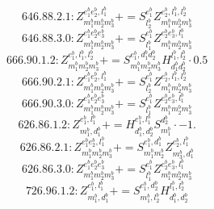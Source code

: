 \documentclass[letterpaper,10pt,fleqn,leqno,onecolumn]{article}
\begin{document}
\begin{equation} \;\;\;\;\;\;  646.88.2.1: Z^{e_{1}^{b}e_{2}^{b},l_{1}^{b}}_{m_{1}^{b}m_{2}^{b}m_{3}^{b}}+=S^{e_{1}^{b}}_{l_{2}^{b}}Z^{e_{2}^{b},l_{1}^{b},l_{2}^{b}}_{m_{1}^{b}m_{2}^{b}m_{3}^{b}} \end{equation}
\begin{equation} \;\;\;\;\;\;  646.88.3.0: Z^{e_{1}^{b}e_{2}^{b}e_{3}^{b}}_{m_{1}^{b}m_{2}^{b}m_{3}^{b}}+=S^{e_{1}^{b}}_{l_{1}^{b}}Z^{e_{2}^{b}e_{3}^{b},l_{1}^{b}}_{m_{1}^{b}m_{2}^{b}m_{3}^{b}} \end{equation}
\begin{equation} \;\;\;\;\;\;  666.90.1.2: Z^{e_{1}^{b},l_{1}^{b},l_{2}^{b}}_{m_{1}^{b}m_{2}^{b}m_{3}^{b}}+=S^{e_{1}^{b},d_{1}^{b}d_{2}^{b}}_{m_{1}^{b}m_{2}^{b}m_{3}^{b}}H^{l_{1}^{b},l_{2}^{b}}_{d_{1}^{b}d_{2}^{b}}\cdot 0.5 \end{equation}
\begin{equation} \;\;\;\;\;\;  666.90.2.1: Z^{e_{1}^{b}e_{2}^{b},l_{1}^{b}}_{m_{1}^{b}m_{2}^{b}m_{3}^{b}}+=S^{e_{1}^{b}}_{l_{2}^{b}}Z^{e_{2}^{b},l_{1}^{b},l_{2}^{b}}_{m_{1}^{b}m_{2}^{b}m_{3}^{b}} \end{equation}
\begin{equation} \;\;\;\;\;\;  666.90.3.0: Z^{e_{1}^{b}e_{2}^{b}e_{3}^{b}}_{m_{1}^{b}m_{2}^{b}m_{3}^{b}}+=S^{e_{1}^{b}}_{l_{1}^{b}}Z^{e_{2}^{b}e_{3}^{b},l_{1}^{b}}_{m_{1}^{b}m_{2}^{b}m_{3}^{b}} \end{equation}
\begin{equation} \;\;\;\;\;\;  626.86.1.2: Z^{e_{1}^{b},l_{1}^{b}}_{m_{1}^{b},d_{1}^{b}}+=H^{e_{1}^{b},l_{1}^{b}}_{d_{1}^{b},d_{2}^{b}}S^{d_{2}^{b}}_{m_{1}^{b}}\cdot -1. \end{equation}
\begin{equation} \;\;\;\;\;\;  626.86.2.1: Z^{e_{1}^{b}e_{2}^{b},l_{1}^{b}}_{m_{1}^{b}m_{2}^{b}m_{3}^{b}}+=S^{e_{1}^{b},d_{1}^{b}}_{m_{1}^{b}m_{2}^{b}}Z^{e_{2}^{b},l_{1}^{b}}_{m_{3}^{b},d_{1}^{b}} \end{equation}
\begin{equation} \;\;\;\;\;\;  626.86.3.0: Z^{e_{1}^{b}e_{2}^{b}e_{3}^{b}}_{m_{1}^{b}m_{2}^{b}m_{3}^{b}}+=S^{e_{1}^{b}}_{l_{1}^{b}}Z^{e_{2}^{b}e_{3}^{b},l_{1}^{b}}_{m_{1}^{b}m_{2}^{b}m_{3}^{b}} \end{equation}
\begin{equation} \;\;\;\;\;\;  726.96.1.2: Z^{e_{1}^{b},l_{1}^{b}}_{m_{1}^{b},d_{1}^{b}}+=S^{e_{1}^{b},d_{2}^{b}}_{m_{1}^{b},l_{2}^{b}}H^{l_{1}^{b},l_{2}^{b}}_{d_{1}^{b},d_{2}^{b}} \end{equation}
\end{document}
